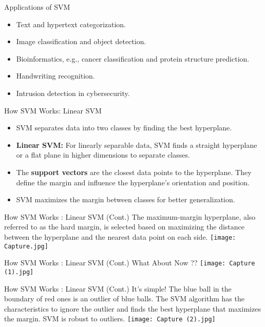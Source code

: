 \documentclass[serif, aspectratio=169]{beamer}
\begin{document}
\begin{frame}{Applications of SVM}
    \begin{itemize}
        \item Text and hypertext categorization.
        \item Image classification and object detection.
        \item Bioinformatics, e.g., cancer classification and protein structure prediction.
        \item Handwriting recognition.
        \item Intrusion detection in cybersecurity.
    \end{itemize}
\end{frame}

\begin{frame}{How SVM Works: Linear SVM}
    \begin{itemize}
        \item SVM separates data into two classes by finding the best hyperplane.
        \item \textbf{Linear SVM:} For linearly separable data, SVM finds a straight hyperplane or a flat plane in higher dimensions to separate classes.
        \item The \textbf{support vectors} are the closest data points to the hyperplane. They define the margin and influence the hyperplane's orientation and position.
        \item SVM maximizes the margin between classes for better generalization.
    \end{itemize}
\end{frame}

\begin{frame}{How SVM Works : Linear SVM (Cont.)}
    The maximum-margin hyperplane, also referred to as the hard margin, is selected based on maximizing the distance between the hyperplane and the nearest data point on each side.
    \centering
    \texttt{[image: Capture.jpg]}
\end{frame}


\begin{frame}{How SVM Works : Linear SVM (Cont.)}
    What About Now ??
    \centering
    \texttt{[image: Capture (1).jpg]}
\end{frame}


\begin{frame}{How SVM Works : Linear SVM (Cont.)}
    It’s simple! The blue ball in the boundary of red ones is an outlier of blue balls. The SVM algorithm has the characteristics to ignore the outlier and finds the best hyperplane that maximizes the margin. SVM is robust to outliers.
    \centering
    \texttt{[image: Capture (2).jpg]}
\end{frame}
\end{document}
